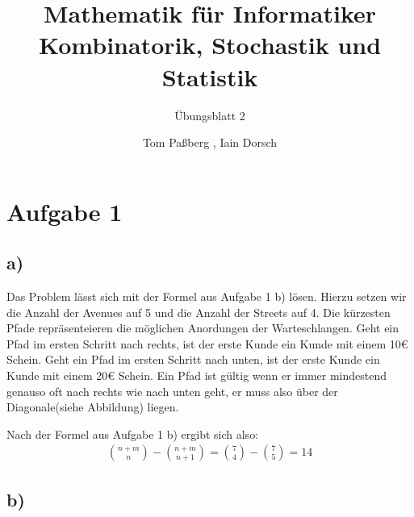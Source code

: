 \documentclass[a4paper]{scrartcl}
\title{Mathematik für Informatiker \\ Kombinatorik, Stochastik und Statistik}
\subtitle{Übungsblatt 2}
\author{Tom Paßberg , Iain Dorsch}
\date{}
\begin{document}
\maketitle

\newpage
\section*{Aufgabe 1}
\subsection*{a)}

Das Problem lässt sich mit der Formel aus Aufgabe 1 b) lösen.
Hierzu setzen wir die Anzahl der Avenues auf 5 und die Anzahl der Streets auf 4.
Die kürzesten Pfade repräsenteieren die möglichen Anordungen der Warteschlangen.
Geht ein Pfad im ersten Schritt nach rechts, ist der erste Kunde ein Kunde mit einem 10€ Schein.
Geht ein Pfad im ersten Schritt nach unten, ist der erste Kunde ein Kunde mit einem 20€ Schein.
Ein Pfad ist gültig wenn er immer mindestend genauso oft nach rechts wie nach unten geht, er muss also über der Diagonale(siehe Abbildung) liegen.

\begin{center}
\end{center}

Nach der Formel aus Aufgabe 1 b) ergibt sich also:
\begin{align*}
    \binom{n+m}{n} - \binom{n+m}{n+1} = \binom{7}{4} - \binom{7}{5} = 14
\end{align*}
    
\subsection*{b)}
\end{document}
